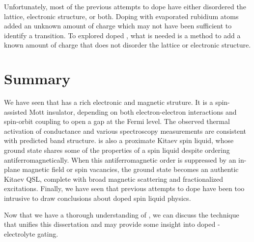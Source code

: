 Unfortunately, most of the previous attempts to dope \rucl have either disordered the lattice, electronic structure, or both. Doping with evaporated rubidium atoms added an unknown amount of charge which may not have been sufficient to identify a transition. To explored doped \ruclnospace, what is needed is a method to add a known amount of charge that does not disorder the lattice or electronic structure.

\section{Summary}

We have seen that \ruclnospace has a rich electronic and magnetic struture. It is a spin-assisted Mott insulator, depending on both electron-electron interactions and spin-orbit coupling to open a gap at the Fermi level. The observed thermal activation of conductance and various spectroscopy measurements are consistent with predicted band structure. \rucl is also a proximate Kitaev spin liquid, whose ground state shares some of the properties of a spin liquid despite ordering antiferromagnetically. When this antiferromagnetic order is suppressed by an in-plane magnetic field or spin vacancies, the ground state becomes an authentic Kitaev QSL, complete with broad magnetic scattering and fractionalized excitations. Finally, we have seen that previous attempts to dope \rucl have been too intrusive to draw conclusions about doped spin liquid physics.

Now that we have a thorough understanding of \ruclnospace , we can discuss the technique that unifies this dissertation and may provide some insight into doped \rucl - electrolyte gating.